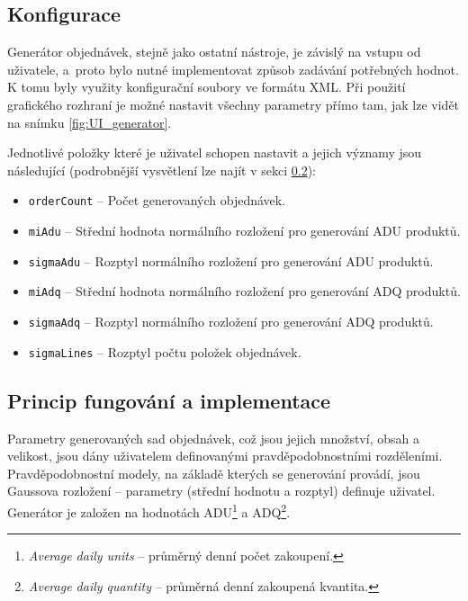 \subsection{Konfigurace}
Generátor objednávek, stejně jako ostatní nástroje, je závislý na vstupu od uživatele, a~proto bylo nutné implementovat způsob zadávání potřebných hodnot. K tomu byly využity konfigurační soubory ve formátu XML. Při použití grafického rozhraní je možné nastavit všechny parametry přímo tam, jak lze vidět na snímku \ref{fig:UI_generator}.

Jednotlivé položky které je uživatel schopen nastavit a jejich významy jsou následující (podrobnější vysvětlení lze najít v sekci \ref{section:impl_gen}):

\begin{itemize}
    \item \texttt{orderCount} -- Počet generovaných objednávek.
    \item \texttt{miAdu} -- Střední hodnota normálního rozložení pro generování ADU produktů.
    \item \texttt{sigmaAdu} -- Rozptyl normálního rozložení pro generování ADU produktů.
    \item \texttt{miAdq} -- Střední hodnota normálního rozložení pro generování ADQ produktů.
    \item \texttt{sigmaAdq} -- Rozptyl normálního rozložení pro generování ADQ produktů.
    \item \texttt{sigmaLines} -- Rozptyl počtu položek objednávek.
\end{itemize}

\subsection{Princip fungování a implementace}
\label{section:impl_gen}
Parametry generovaných sad objednávek, což jsou jejich množství, obsah a velikost, jsou dány uživatelem definovanými pravděpodobnostními rozděleními. Pravděpodobnostní modely, na základě kterých se generování provádí, jsou Gaussova rozložení -- parametry (střední hodnotu a rozptyl) definuje uživatel. Generátor je založen na hodnotách ADU\footnote{\emph{Average daily units} -- průměrný denní počet zakoupení.} a ADQ\footnote{\emph{Average daily quantity} -- průměrná denní zakoupená kvantita.}.

